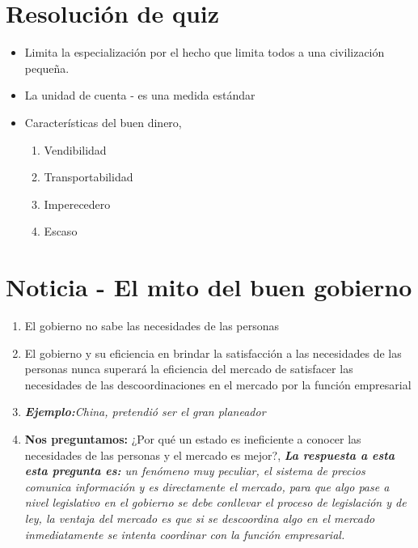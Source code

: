\section{Resolución de quiz}
\begin{itemize}
    \item Limita la especialización por el hecho que limita todos a una civilización pequeña.
    \item La unidad de cuenta -  es una medida estándar
    \item Características del buen dinero,
        \begin{enumerate}
            \item Vendibilidad
            \item Transportabilidad
            \item Imperecedero
            \item Escaso
        \end{enumerate}
\end{itemize}

\section{Noticia - El mito del buen gobierno}
\begin{enumerate}
    \item El gobierno no sabe las necesidades de las personas
    \item El gobierno y su eficiencia en brindar la satisfacción a las necesidades de las personas nunca superará la eficiencia del mercado de satisfacer las necesidades de las descoordinaciones en el mercado por la función empresarial
    \item \emph{\textbf{Ejemplo:}China, pretendió ser el gran planeador}
    \item \textbf{Nos preguntamos:} ¿Por qué un estado es ineficiente a conocer las necesidades de las personas y el mercado es mejor?, \emph{\textbf{La respuesta a esta esta pregunta es: }un fenómeno muy peculiar, el sistema de precios comunica información y es directamente el mercado, para que algo pase a nivel legislativo en el gobierno se debe conllevar el proceso de legislación y de ley, la ventaja del mercado es que si se descoordina algo en el mercado inmediatamente se intenta coordinar con la función empresarial.}
\end{enumerate}

